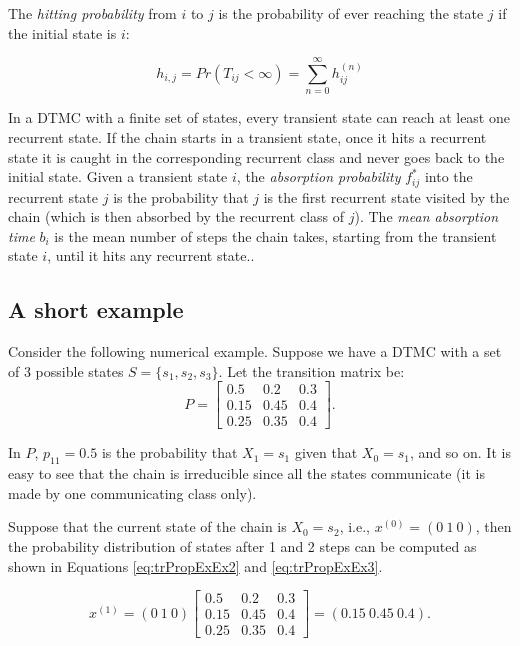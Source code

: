 \documentclass[
  nojss]{jss}
\begin{document}
The \emph{hitting probability} from \(i\) to \(j\) is the probability of ever reaching the state \(j\) if the initial state is \(i\):

\begin{equation}
h_{i,j} = Pr(T_{ij} < \infty) = \sum_{n = 0}^{\infty} h_{ij}^{(n)}
\label{eq:hitting-probs}
\end{equation}

In a DTMC with a finite set of states, every transient state can reach at least one recurrent state. If the chain starts in a transient state, once it hits a recurrent state it is caught in the corresponding recurrent class and never goes back to the initial state. Given a transient state \(i\), the \emph{absorption probability} \(f^{*}_{ij}\) into the recurrent state \(j\) is the probability that \(j\) is the first recurrent state visited by the chain (which is then absorbed by the recurrent class of \(j\)). The \emph{mean absorption time} \(b_i\) is the mean number of steps the chain takes, starting from the transient state \(i\), until it hits any recurrent state..

\subsection{A short example}\label{a-short-example}

Consider the following numerical example. Suppose we have a DTMC with a set of 3 possible states \(S=\{s_{1}, s_{2}, s_{3}\}\). Let the transition matrix be:
\begin{equation}
P=\left[\begin{array}{ccc}
0.5 & 0.2 & 0.3\\
0.15 & 0.45 & 0.4\\
0.25 & 0.35 & 0.4
\end{array}\right].
\label{eq:trPropExEx1}
\end{equation}

In \(P\), \(p_{11}=0.5\) is the probability that \(X_{1}=s_{1}\) given that \(X_{0}=s_{1}\), and so on. It is easy to see that the chain is irreducible since all the states communicate (it is made by one communicating class only).

Suppose that the current state of the chain is \(X_{0}=s_{2}\), i.e., \(x^{(0)}=(0\:1\:0)\), then the probability distribution of states after 1 and 2 steps can be computed as shown in Equations \eqref{eq:trPropExEx2} and \eqref{eq:trPropExEx3}.

\begin{equation}
x^{(1)}=\left(0\:1\:0\right)\left[\begin{array}{ccc}
0.5 & 0.2 & 0.3\\
0.15 & 0.45 & 0.4\\
0.25 & 0.35 & 0.4
\end{array}\right]=\left(0.15\:0.45\:0.4\right).
\label{eq:trPropExEx2}
\end{equation}
\end{document}
